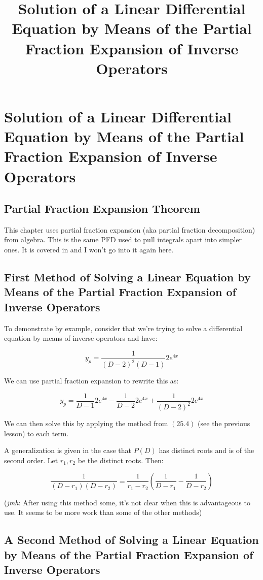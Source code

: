 \documentclass{article}
\title{Solution of a Linear Differential Equation by Means of the Partial Fraction Expansion of Inverse Operators}
\begin{document}
\section{Solution of a Linear Differential Equation by Means of the Partial Fraction Expansion of Inverse Operators}

\subsection{Partial Fraction Expansion Theorem}

This chapter uses partial fraction expansion (aka partial fraction decomposition) from algebra. This is the same PFD used to pull integrals apart into simpler ones. It is covered in  and I won't go into it again here.

\subsection{First Method of Solving a Linear Equation by Means of the Partial Fraction Expansion of Inverse Operators}

To demonstrate by example, consider that we're trying to solve a differential equation by means of inverse operators and have:

\[ \tag{c} y_p = \frac{1}{(D-2)^2 (D-1)} 2e^{4x} \]

We can use partial fraction expansion to rewrite this as:

\[ \tag{d} y_p = \frac{1}{D - 1} 2e^{4x} - \frac{1}{D-2} 2e^{4x} + \frac{1}{(D-2)^2} 2e^{4x} \]

We can then solve this by applying the method from $(25.4)$ (see the previous lesson) to each term.

A generalization is given in the case that $P(D)$ has distinct roots and is of the second order. Let $r_1, r_2$ be the distinct roots. Then:

\[ \tag{26.21} \frac{1}{(D-r_1)(D - r_2)} = \frac{1}{r_1 - r_2}(\frac{1}{D - r_1} - \frac{1}{D - r_2}) \]

(\emph{jmh}: After using this method some, it's not clear when this is advantageous to use. It seems to be more work than some of the other methods)

\subsection{A Second Method of Solving a Linear Equation by Means of the Partial Fraction Expansion of Inverse Operators}
\end{document}
